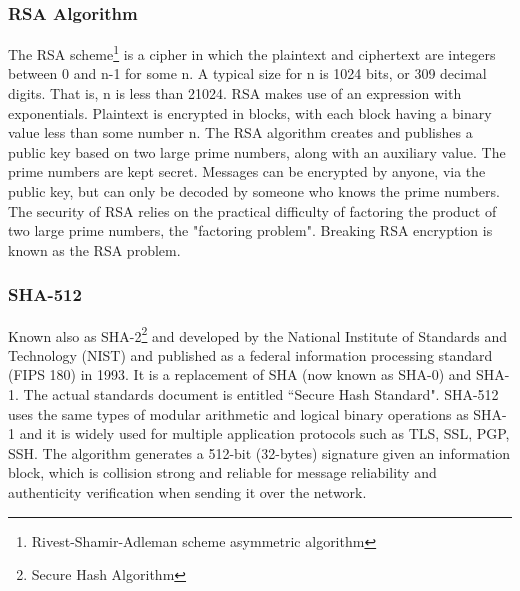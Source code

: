\documentclass[letterpaper,12pt]{article}
\begin{document}
    \subsubsection{RSA Algorithm}
    The RSA scheme\footnote{Rivest-Shamir-Adleman scheme asymmetric algorithm\cite{WS2017-RSA}} is a cipher in which the plaintext and ciphertext are integers between 0 and n-1 for some n. A typical size for n is 1024 bits, or 309 decimal digits. That is, n is less than 21024. RSA makes use of an expression with exponentials. Plaintext is encrypted in blocks,
with each block having a binary value less than some number n. The RSA algorithm creates and publishes a public key based on two large prime numbers, along with an auxiliary value. The prime numbers are kept secret. Messages can be encrypted by anyone, via the public key, but can only be decoded by someone who knows the prime numbers. The security of RSA relies on the practical difficulty of factoring the product of two large prime numbers, the "factoring problem". Breaking RSA encryption is known as the RSA problem.
    \subsubsection{SHA-512}
Known also as SHA-2\footnote{Secure Hash Algorithm} and developed by the National Institute of Standards and Technology (NIST) and published as a federal information processing standard (FIPS 180) in 1993. It is a replacement of SHA (now known as SHA-0) and SHA-1. The actual standards document is entitled
“Secure Hash Standard". SHA-512 uses the same types of modular arithmetic and logical binary operations as SHA-1 and it is widely used for multiple application protocols such as TLS, SSL, PGP, SSH. The algorithm generates a 512-bit (32-bytes) signature given an information block, which is collision strong and reliable for message reliability and authenticity verification when sending it over the network.
\end{document}

